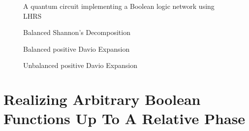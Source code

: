 \documentclass[a4paper]{article}
\begin{document}
{\begin{figure}[tbp]
    \centering
    \scalebox{1}{}
    \caption{A quantum circuit implementing a Boolean logic network using LHRS }
    \label{fig-lut-qc}
\vspace*{-1cm}
\end{figure}
\begin{figure}[t]
  \begin{minipage}{0.8\linewidth}
    \begin{center}
      \scalebox{0.5} {
        
      }
    \end{center}
    \caption{Balanced Shannon's Decomposition}
    \label{app-shannon}
  \end{minipage}
\vspace*{-0.5cm}
\end{figure}
\begin{figure}[t]
  \begin{minipage}{0.9\linewidth}
    \begin{center}
      \scalebox{0.5} {
        
      }
    \end{center}
    \vspace*{-0.5cm}
    \caption{Balanced positive Davio Expansion}
    \label{app-davio-pos}
  \end{minipage}
\vspace*{-0.5cm}
\end{figure}
\begin{figure}[t]
  \begin{minipage}{0.45\textwidth}
    \begin{center}
      \scalebox{0.6} {
        
      }
    \end{center}
    \vspace*{-0.5cm}
    \caption{Unbalanced positive Davio Expansion}
    \label{app-davio-pos-unb}
  \end{minipage}
\vspace*{-0.5cm}
\end{figure}

\section{Realizing Arbitrary Boolean Functions Up To A Relative Phase}
\label{Subsec:FNOT}


}
\end{document}
